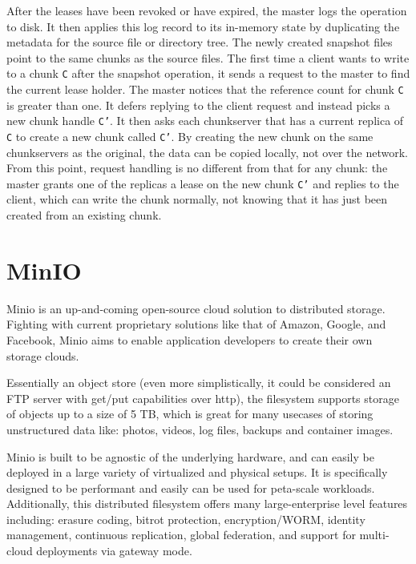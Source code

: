 \documentclass{article}
\begin{document}
After the leases have been revoked or have expired, the master logs the operation to disk. It then applies this log record to its in-memory state by duplicating the metadata for the source file or directory tree. The newly created snapshot files point to the same chunks as the source files.  The first time a client wants to write to a chunk \texttt{C} after the snapshot operation, it sends a request to the master to find the current lease holder. The master notices that the reference count for chunk \texttt{C} is greater than one. It defers replying to the client request and instead picks a new chunk handle \texttt{C’}.  It then asks each chunkserver that has a current replica of \texttt{C} to create a new chunk called \texttt{C’}. By creating the new chunk on the same chunkservers as the original, the data can be copied locally, not over the network.  From this point, request handling is no different from that for any chunk: the master grants one of the replicas a lease on the new chunk \texttt{C’} and replies to the client, which can write the chunk normally, not knowing that it has just been created from an existing chunk.

\section{MinIO}
Minio is an up-and-coming open-source cloud solution to distributed storage. Fighting with current proprietary solutions like that of Amazon, Google, and Facebook, Minio aims to enable application developers to create their own storage clouds.

Essentially an object store (even more simplistically, it could be considered an FTP server with get/put capabilities over http), the filesystem supports storage of objects up to a size of 5 TB, which is great for many usecases of storing unstructured data like: photos, videos, log files, backups and container images. 

Minio is built to be agnostic of the underlying hardware, and can easily be deployed in a large variety of virtualized and physical setups. It is specifically designed to be performant and easily can be used for peta-scale workloads. Additionally, this distributed filesystem offers many large-enterprise level features including: erasure coding, bitrot protection, encryption/WORM, identity management, continuous replication, global federation, and support for multi-cloud deployments via gateway mode.
\end{document}
